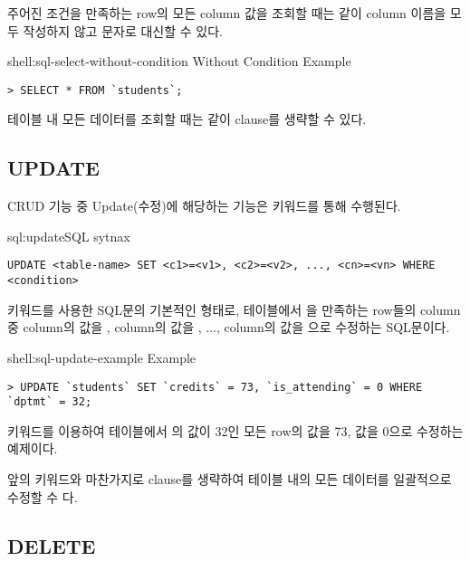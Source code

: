 주어진 조건을 만족하는 row의 모든 column 값을 조회할 때는 \와 같이 column 이름을 모두 작성하지 않고 \cd{*} 문자로 대신할 수 있다.

\begin{shellenv}{shell:sql-select-without-condition}{ Without Condition Example}\begin{verbatim}
> SELECT * FROM `students`;
\end{verbatim}
\end{shellenv}

테이블 내 모든 데이터를 조회할 때는 \과 같이  clause를 생략할 수 있다.

\subsection*{UPDATE}

CRUD 기능 중 Update(수정)에 해당하는 기능은  키워드를 통해 수행된다.

\begin{sqlenv}{sql:update}{SQL  sytnax}\begin{verbatim}
UPDATE <table-name> SET <c1>=<v1>, <c2>=<v2>, ..., <cn>=<vn> WHERE <condition>
\end{verbatim}
\end{sqlenv}

\는  키워드를 사용한 SQL문의 기본적인 형태로,  테이블에서 을 만족하는 row들의 column 중  column의 값을 ,  column의 값을 , ...,  column의 값을 으로 수정하는 SQL문이다.

\begin{shellenv}{shell:sql-update-example}{ Example}\begin{verbatim}
> UPDATE `students` SET `credits` = 73, `is_attending` = 0 WHERE `dptmt` = 32;
\end{verbatim}
\end{shellenv}

\은  키워드를 이용하여  테이블에서 의 값이 32인 모든 row의  값을 73,  값을 0으로 수정하는 예제이다.

앞의  키워드와 마찬가지로  clause를 생략하여 테이블 내의 모든 데이터를 일괄적으로 수정할 수 다.

\subsection*{DELETE}


